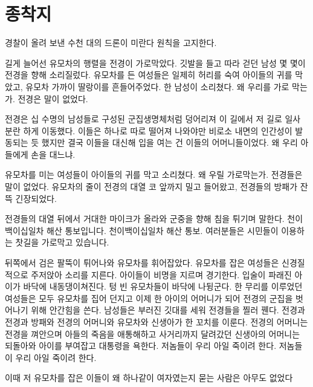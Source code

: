 \hypertarget{uxc885uxcc29uxc9c0}{%

\chapter{종착지}\label{uxc885uxcc29uxc9c0}}



경찰이 올려 보낸 수천 대의 드론이 미란다 원칙을 고지한다.



길게 늘어선 유모차의 행렬을 전경이 가로막았다. 깃발을 들고 따라 걷던 남성 몇 몇이 전경을 향해 소리질렀다. 유모차를 든 여성들은 일제히 허리를 숙여 아이들의 귀를 막았고, 유모차 가까이 딸랑이를 흔들어주었다. 한 남성이 소리쳤다. 왜 우리를 가로 막는가. 전경은 말이 없었다.



전경은 십 수명의 남성들로 구성된 군집생명체처럼 덩어리져 이 길에서 저 길로 일사 분란 하게 이동했다. 이들은 하나로 따로 떨어져 나와야만 비로소 내면의 인간성이 발동되는 듯 했지만 결국 이들을 대신해 입을 여는 건 이들의 어머니들이었다. 왜 우리 아들에게 손을 대느냐.



유모차를 미는 여성들이 아이들의 귀를 막고 소리쳤다. 왜 우릴 가로막는가. 전경들은 말이 없었다. 유모차의 줄이 전경의 대열 코 앞까지 밀고 들어왔고, 전경들의 방패가 잔뜩 긴장되었다.



전경들의 대열 뒤에서 거대한 마이크가 올라와 군중을 향해 침을 튀기며 말한다. 천이백이십일차 해산 통보입니다. 천이백이십일차 해산 통보. 여러분들은 시민들이 이용하는 찻길을 가로막고 있습니다.



뒤쪽에서 검은 팔뚝이 튀어나와 유모차를 휘어잡았다. 유모차를 잡은 여성들은 신경질적으로 주저앉아 소리를 지른다. 아이들이 비명을 지르며 경기한다. 입술이 파래진 아이가 바닥에 내동댕이쳐진다. 텅 빈 유모차들이 바닥에 나뒹군다. 한 무리를 이루었던 여성들은 모두 유모차를 집어 던지고 이제 한 아이의 어머니가 되어 전경의 군집을 벗어나기 위해 안간힘을 쓴다. 남성들은 부러진 깃대를 세워 전경들을 찔러 꿴다. 전경과 전경과 방패와 전경의 어머니와 유모차와 신생아가 한 꼬치를 이룬다. 전경의 어머니는 전경을 껴안으며 아들의 죽음을 애통해하고 사거리까지 달려갔던 신생아의 어머니는 되돌아와 아이를 부여잡고 대통령을 욕한다. 저놈들이 우리 아일 죽이려 한다. 저놈들이 우리 아일 죽이려 한다.



이때 저 유모차를 잡은 이들이 왜 하나같이 여자였는지 묻는 사람은 아무도 없었다



